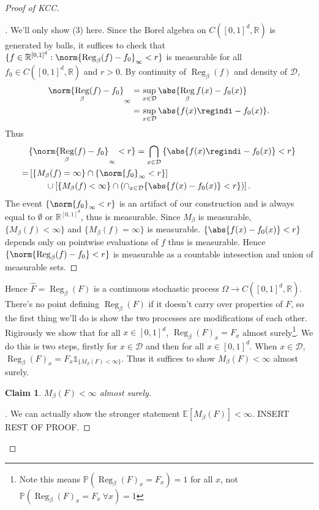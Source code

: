 \documentclass[fontsize=12pt, DIV=10]{scrreprt}
\newtheorem{claim}{Claim}
\theoremstyle{remark}
\newenvironment{subproof}[1][\proofname]{%
  \renewcommand{\qedsymbol}{$\blacksquare$}%
  \begin{proof}[#1]%
}{%
  \end{proof}%
}
\newcommand{\R}{\mathbb R}
\newcommand{\E}{\mathbb E}
\newcommand{\prob}{\mathbb P}
\newcommand{\indi}{\mathbb 1}
\newcommand{\calD}{\mathcal D}
\DeclareMathOperator{\reg}{Reg}
\newcommand{\boxspace}{\ensuremath{\R^{[0, 1]^d}}}
\newcommand{\unitbox}{\ensuremath{[0,1]^d}}
\begin{document}
\begin{proof}[Proof of KCC]
	\begin{subproof}
	We'll only show (3) here. Since the Borel algebra on $C([0, 1]^d, \R)$ is generated by balls, it suffices to check that $\{f \in \boxspace : \norm{\reg_{\beta}(f) - f_0}_{\infty} < r\}$ is measurable for all $f_0 \in C([0, 1]^d, \R)$ and $r > 0$. By continuity of $\reg_{\beta}(f)$ and density of $\calD$,
	\begin{align}
		\norm{\reg_{\beta}(f) - f_0}_{\infty}
		&= \sup_{x \in \calD} \abs{\reg_{\beta}f(x) - f_0(x)} \\
		&= \sup_{x \in \calD} \abs{f(x) \regindi - f_0(x)}.
	\end{align}
	Thus
	\begin{align}
		&\{\norm{\reg_{\beta}(f) - f_0}_{\infty} < r\}
		= \bigcap_{x \in \calD} \left\{ \abs{f(x) \regindi - f_0(x)} < r \right\} \\
		=& \left[ \{M_{\beta}(f) = \infty\} \cap \{\norm{f_0}_{\infty} < r\} \right] \nonumber \\
		 & \qquad \cup \left[ \{M_{\beta}(f) < \infty\} \cap \left( \cap_{x \in \calD} \{\abs{f(x) - f_0(x)} < r\} \right) \right].
	\end{align}
	The event $\{\norm{f_0}_{\infty} < r\}$ is an artifact of our construction and is always equal to $\emptyset$ or $\boxspace$, thus is measurable. Since $M_{\beta}$ is measurable, $\{M_{\beta}(f) < \infty\}$ and $\{M_{\beta}(f) = \infty\}$ is measurable. $\{\abs{f(x) - f_0(x)} < r\}$ depends only on pointwise evaluations of $f$ thus is measurable. Hence $\{\norm{\reg_{\beta}(f) - f_0} < r\}$ is measurable as a countable intesection and union of measurable sets.
	\end{subproof}

	Hence $\hat{F} = \reg_{\beta}(F)$ is a continuous stochastic process $\Omega \to C(\unitbox, \R)$. There's no point defining $\reg_{\beta}(F)$ if it doesn't carry over properties of $F$, so the first thing we'll do is show the two processes are modifications of each other. Rigirously we show that for all $x \in [0, 1]^d$, $\reg_{\beta}(F)_x = F_x$ almost surely\footnote{Note this means $\prob(\reg_{\beta}(F)_x = F_x) = 1$ for all $x$, not $\prob(\reg_{\beta}(F)_x = F_x \ \forall x) = 1$}. We do this is two steps, firstly for $x \in \calD$ and then for all $x \in [0, 1]^d$. When $x \in \calD$, $\reg_{\beta}(F)_x = F_x \indi_{\{M_{\beta}(F) < \infty\}}$. Thus it suffices to show $M_{\beta}(F) < \infty$ almost surely.
	\begin{claim}
		$M_{\beta}(F) < \infty$ almost surely.
	\end{claim}
	\begin{subproof}
		We can actually show the stronger statement $\E[M_{\beta}(F)] < \infty$. INSERT REST OF PROOF.
	\end{subproof}
	

\end{proof}
\end{document}
